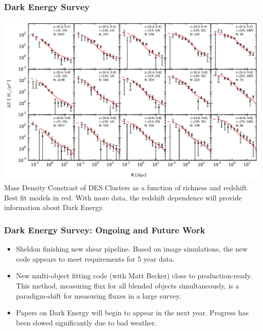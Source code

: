 \documentclass{beamer}
\begin{document}
{\begin{columns}
    \end{columns}

}

\frame
{

    \frametitle{Dark Energy Survey}

    \fontsize{9}{0.8\baselineskip}

    \includegraphics[width=\textwidth]{clusters-randoms_noqc_bestfit.pdf}
    \newline
    {\small Mass Density Constrast of DES Clusters as a function of richness
    and redshift.  Best fit models in red.  With more data, the redshift dependence will provide
    information about Dark Energy.}


}

\frame
{

    \frametitle{Dark Energy Survey: Ongoing and Future Work}

    \fontsize{9}{0.8\baselineskip}



            \begin{itemize}

                \item Sheldon finishing new shear pipeline.  Based on image
                    simulations, the new code appears to meet requirements for
                    5 year data.

                \item New multi-object fitting code (with Matt Becker) close to
                    production-ready.  This method, measuring flux for all
                    blended objects simultaneously, is a paradigm-shift for
                    measuring fluxes in a large survey.

                \item Papers on Dark Energy will begin to appear in the next year.  
                    Progress has been slowed significantly due to bad weather.

            \end{itemize}


}
\end{document}
